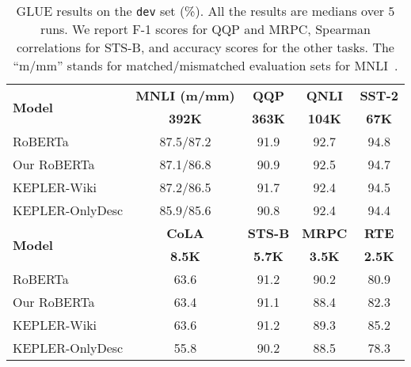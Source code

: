 \begin{table}[t]
    \centering
    \tablefont
    \begin{adjustbox}{max width=0.98\linewidth}
    \begin{tabular}{lcccc}
        \toprule
        \multirow{2}{*}{\textbf{Model}} & \textbf{MNLI (m/mm)} & \textbf{QQP} &  \textbf{QNLI}  & \textbf{SST-2} \\
              & {\scriptsize \textbf{392K}} & {\scriptsize \textbf{363K}} & {\scriptsize \textbf{104K}} & {\scriptsize \textbf{67K}}\\
        \midrule
        RoBERTa & 87.5/87.2 &  91.9 & 92.7 & 94.8\\
        Our RoBERTa & 87.1/86.8 & 90.9 & 92.5 & 94.7 \\
        KEPLER-Wiki & 87.2/86.5  & 91.7 & 92.4 & 94.5\\
        KEPLER-OnlyDesc & 85.9/85.6  & 90.8 & 92.4 & 94.4\\
        \bottomrule
        \toprule
        \multirow{2}{*}{\textbf{Model}} &  \textbf{CoLA} & \textbf{STS-B} & \textbf{MRPC} & \textbf{RTE} \\
              & {\scriptsize \textbf{8.5K}} & {\scriptsize \textbf{5.7K}} & {\scriptsize \textbf{3.5K}} & {\scriptsize \textbf{2.5K}}  \\
        \midrule
        RoBERTa &   63.6 & 91.2   & 90.2 & 80.9\\
        Our RoBERTa &  63.4 & 91.1  & 88.4 & 82.3\\
        KEPLER-Wiki &  63.6 & 91.2 & 89.3 & 85.2  \\
        KEPLER-OnlyDesc & 55.8 & 90.2 & 88.5 & 78.3\\
        \bottomrule
    \end{tabular}
    \end{adjustbox}
    
    \caption{GLUE results on the \texttt{dev} set (\%). All the results are medians over $5$ runs. We report F-1 scores for QQP and MRPC, Spearman correlations for STS-B, and accuracy scores for the other tasks. The ``m/mm'' stands for matched/mismatched evaluation sets for MNLI~\citep{N18-1101}.} \label{tab:glue}
\end{table}


